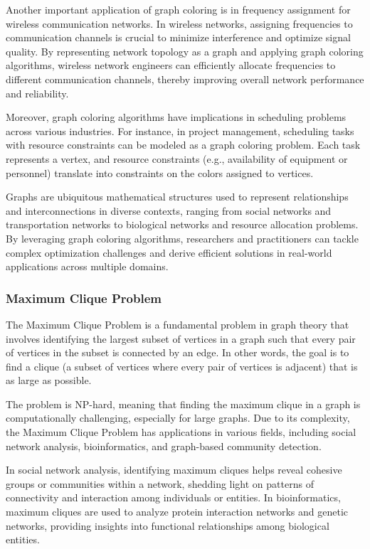 \documentclass[11pt]{report}
\begin{document}
        Another important application of graph coloring is in frequency assignment for wireless communication networks. In wireless networks, assigning frequencies to communication channels is crucial to minimize interference and optimize signal quality. By representing network topology as a graph and applying graph coloring algorithms, wireless network engineers can efficiently allocate frequencies to different communication channels, thereby improving overall network performance and reliability.
        
        Moreover, graph coloring algorithms have implications in scheduling problems across various industries. For instance, in project management, scheduling tasks with resource constraints can be modeled as a graph coloring problem. Each task represents a vertex, and resource constraints (e.g., availability of equipment or personnel) translate into constraints on the colors assigned to vertices.
        
        Graphs are ubiquitous mathematical structures used to represent relationships and interconnections in diverse contexts, ranging from social networks and transportation networks to biological networks and resource allocation problems. By leveraging graph coloring algorithms, researchers and practitioners can tackle complex optimization challenges and derive efficient solutions in real-world applications across multiple domains.

        \subsubsection{Maximum Clique Problem}
        The Maximum Clique Problem is a fundamental problem in graph theory that involves identifying the largest subset of vertices in a graph such that every pair of vertices in the subset is connected by an edge. In other words, the goal is to find a clique (a subset of vertices where every pair of vertices is adjacent) that is as large as possible.

        The problem is NP-hard, meaning that finding the maximum clique in a graph is computationally challenging, especially for large graphs. Due to its complexity, the Maximum Clique Problem has applications in various fields, including social network analysis, bioinformatics, and graph-based community detection.
        
        In social network analysis, identifying maximum cliques helps reveal cohesive groups or communities within a network, shedding light on patterns of connectivity and interaction among individuals or entities. In bioinformatics, maximum cliques are used to analyze protein interaction networks and genetic networks, providing insights into functional relationships among biological entities.
\end{document}
